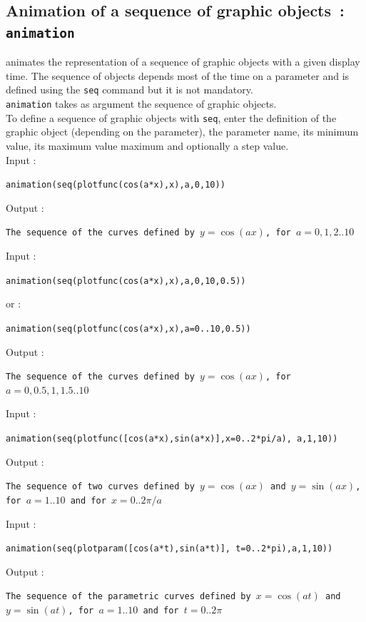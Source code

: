 \documentclass[a4paper,11pt]{book}
\begin{document}
\subsection{Animation of a sequence of graphic objects~: {\tt animation}}
 animates the representation of a
sequence of graphic objects
with a given display time. The sequence of objects depends most of
the time on a parameter and is defined using the {\tt seq} command
but it is not mandatory.\\
{\tt animation} takes as argument the sequence of graphic objects.\\
To define a sequence of graphic objects with {\tt seq},
enter the definition of the graphic object (depending on
the parameter), the parameter name, its minimum value, its
 maximum value maximum and optionally a step value.\\
Input :
\begin{center}{\tt animation(seq(plotfunc(cos(a*x),x),a,0,10))}\end{center}
Output :
\begin{center}{\tt The sequence of the curves defined by $y=\cos(ax)$, for $a=0,1,2..10$}\end{center}
Input :
\begin{center}
{\tt animation(seq(plotfunc(cos(a*x),x),a,0,10,0.5))}
\end{center}
or :
\begin{center}
{\tt animation(seq(plotfunc(cos(a*x),x),a=0..10,0.5))}
\end{center}
Output :
\begin{center}{\tt The sequence of the curves defined by $y=\cos(ax)$, for $a=0,0.5,1,1.5..10$ }\end{center}
Input :
\begin{center}{\tt animation(seq(plotfunc([cos(a*x),sin(a*x)],x=0..2*pi/a), a,1,10))}\end{center}
Output :
\begin{center}{\tt The sequence of two curves defined by $y=\cos(ax)$ and $y=\sin(ax)$, for $a=1..10$ and for $x=0..2\pi/a$ }\end{center}
Input :
\begin{center}{\tt animation(seq(plotparam([cos(a*t),sin(a*t)], t=0..2*pi),a,1,10))}\end{center}
Output :
\begin{center}{\tt The sequence of the parametric curves defined by  $x=\cos(at)$ and $y=\sin(at)$, for $a=1..10$ and for $t=0..2\pi$ }\end{center}
\end{document}
